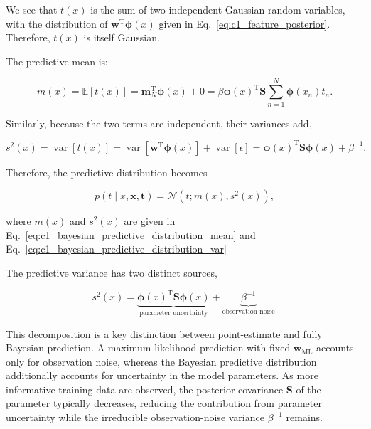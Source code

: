 \documentclass[10pt,twocolumn]{memoir}
\begin{document}
We see that $t(x)$ is the sum of two independent Gaussian random variables, with the distribution of $\mathbf{w}^{\mathrm{T}}\boldsymbol{\phi}(x)$ given in Eq.~\ref{eq:c1_feature_posterior}. Therefore, $t(x)$ is itself Gaussian.

The predictive mean is:

\begin{equation}
    m(x) = \mathbb{E}[t(x)] = \mathbf{m}_N^{\mathrm{T}}\boldsymbol{\phi}(x) + 0 = \beta\boldsymbol{\phi}(x)^{\mathrm{T}}\mathbf{S}\sum_{n=1}^{N}\boldsymbol{\phi}(x_n)t_n.
\label{eq:c1_bayesian_predictive_distribution_mean}
\end{equation}

Similarly, because the two terms are independent, their variances add,

\begin{equation}
    s^2(x) = \operatorname{var}[t(x)] = \operatorname{var}\left[\mathbf{w}^{\mathrm{T}}\boldsymbol{\phi}(x)\right] + \operatorname{var}[\epsilon] = \boldsymbol{\phi}(x)^{\mathrm{T}}\mathbf{S}\boldsymbol{\phi}(x) + \beta^{-1}.
\label{eq:c1_bayesian_predictive_distribution_var}
\end{equation}

Therefore, the predictive distribution becomes

\begin{equation}
    p(t\mid x,\mathbf{x},\mathbf{t}) = \mathcal{N}\left(t;m(x),s^2(x)\right),
\end{equation}

where $m(x)$ and $s^2(x)$ are given in Eq.~\ref{eq:c1_bayesian_predictive_distribution_mean} and Eq.~\ref{eq:c1_bayesian_predictive_distribution_var}

The predictive variance has two distinct sources,

\begin{equation}
    s^2(x) = \underbrace{\boldsymbol{\phi}(x)^{\mathrm{T}}\mathbf{S}\boldsymbol{\phi}(x)}_{\text{parameter uncertainty}} + \underbrace{\beta^{-1}}_{\text{observation noise}}.
\end{equation}

This decomposition is a key distinction between point-estimate and fully Bayesian prediction. A maximum likelihood prediction with fixed $\mathbf{w}_{\mathrm{ML}}$ accounts only for observation noise, whereas the Bayesian predictive distribution additionally accounts for uncertainty in the model parameters. As more informative training data are observed, the posterior covariance $\mathbf{S}$ of the parameter typically decreases, reducing the contribution from parameter uncertainty while the irreducible observation-noise variance $\beta^{-1}$ remains.
\end{document}
